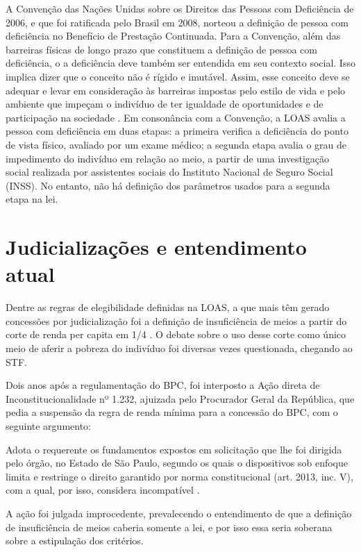\documentclass[
	12pt,				%
	openright,			%
	twoside,			%
	a4paper,			%
	english,			%
	french,				%
	spanish,			%
	brazil				%
	]{abntex2}
\begin{document}
		A  Convenção das Nações Unidas sobre os Direitos das Pessoas com Deficiência de 2006, e que foi ratificada pelo Brasil em 2008, norteou a definição de pessoa com deficiência no Benefício de Prestação Continuada. Para a Convenção, além das barreiras físicas de longo prazo que constituem a definição de pessoa com deficiência, o a deficiência deve também ser entendida em seu contexto social. Isso implica dizer que o conceito não é rígido e imutável. Assim, esse conceito deve se adequar e levar em consideração às barreiras impostas pelo estilo de vida e pelo ambiente que impeçam o indivíduo de ter igualdade de oportunidades e de participação na sociedade \cite{onu2006convention}. Em consonância com a Convenção, a LOAS avalia a pessoa com deficiência em duas etapas: a primeira verifica a deficiência do ponto de vista físico, avaliado por um exame médico; a segunda etapa avalia o grau de impedimento do indivíduo em relação ao meio, a partir de uma investigação social realizada por assistentes sociais do Instituto Nacional de Seguro Social (INSS). No entanto, não há definição dos parâmetros usados para a segunda etapa na lei. 
				
\section{Judicializações e entendimento atual}

Dentre as regras de elegibilidade definidas na LOAS, a que mais têm  gerado concessões por judicialização foi a definição de insuficiência de meios a partir do corte de renda per capita em 1/4 \cite{adriana2016}. O debate sobre o uso desse corte como único meio de aferir a pobreza do indivíduo foi diversas vezes questionada, chegando ao STF. 

Dois anos após a regulamentação do BPC, foi interposto a Ação direta de Inconstitucionalidade nº 1.232, ajuizada pelo Procurador Geral da República, que pedia a suspensão da regra de renda mínima para a concessão do BPC, com o seguinte argumento:

	\begin{citacao}
	Adota o requerente os fundamentos expostos em solicitação que lhe foi dirigida pelo órgão, no Estado de São Paulo, segundo os quais o dispositivos sob enfoque limita e restringe o direito garantido por norma constitucional (art. 2013, inc. V), com a qual, por isso, considera incompatível \cite[pag. 96 ]{acao1232}.
\end{citacao}

A ação foi julgada improcedente, prevalecendo o entendimento de que a definição de insuficiência de meios caberia somente a lei, e por isso essa seria soberana sobre a estipulação dos critérios. 
\end{document}
